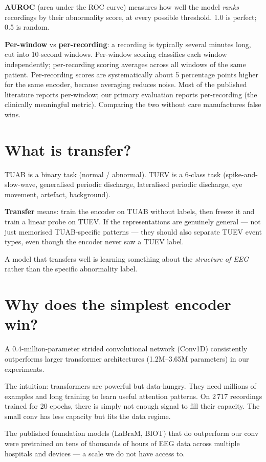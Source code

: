 \documentclass[11pt,a4paper]{article}
\begin{document}
\textbf{AUROC} (area under the ROC curve) measures how well the model
\emph{ranks} recordings by their abnormality score, at every possible
threshold.  1.0 is perfect; 0.5 is random.

\textbf{Per-window} vs \textbf{per-recording}: a recording is typically
several minutes long, cut into 10-second windows.  Per-window scoring
classifies each window independently; per-recording scoring averages across
all windows of the same patient.  Per-recording scores are systematically
about 5 percentage points higher for the same encoder, because averaging
reduces noise.  Most of the published literature reports per-window;
our primary evaluation reports per-recording (the clinically meaningful metric).
Comparing the two without care manufactures false wins.

\section*{What is transfer?}

TUAB is a binary task (normal / abnormal).
TUEV is a 6-class task (spike-and-slow-wave, generalised periodic discharge,
lateralised periodic discharge, eye movement, artefact, background).

\textbf{Transfer} means: train the encoder on TUAB without labels, then freeze
it and train a linear probe on TUEV.  If the representations are genuinely
general — not just memorised TUAB-specific patterns — they should also separate
TUEV event types, even though the encoder never saw a TUEV label.

A model that transfers well is learning something about the \emph{structure
of EEG} rather than the specific abnormality label.

\section*{Why does the simplest encoder win?}

A 0.4-million-parameter strided convolutional network (Conv1D) consistently
outperforms larger transformer architectures (1.2M--3.65M parameters) in
our experiments.

The intuition: transformers are powerful but data-hungry.  They need millions
of examples and long training to learn useful attention patterns.  On 2\,717
recordings trained for 20 epochs, there is simply not enough signal to fill
their capacity.  The small conv has less capacity but fits the data regime.

The published foundation models (LaBraM, BIOT) that do outperform our conv
were pretrained on tens of thousands of hours of EEG data across multiple
hospitals and devices — a scale we do not have access to.
\end{document}
